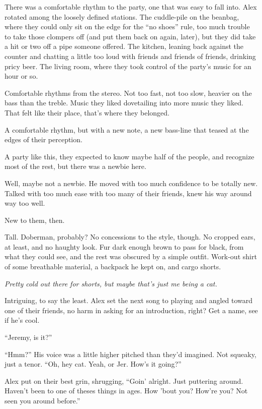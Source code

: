 There was a comfortable rhythm to the party, one that was easy to fall into. Alex rotated among the loosely defined stations. The cuddle-pile on the beanbag, where they could only sit on the edge for the ``no shoes'' rule, too much trouble to take those clompers off (and put them back on again, later), but they did take a hit or two off a pipe someone offered. The kitchen, leaning back against the counter and chatting a little too loud with friends and friends of friends, drinking pricy beer. The living room, where they took control of the party's music for an hour or so.

Comfortable rhythms from the stereo. Not too fast, not too slow, heavier on the bass than the treble. Music they liked dovetailing into more music they liked. That felt like their place, that's where they belonged.

A comfortable rhythm, but with a new note, a new bass-line that teased at the edges of their perception.

A party like this, they expected to know maybe half of the people, and recognize most of the rest, but there was a newbie here.

Well, maybe not a newbie. He moved with too much confidence to be totally new. Talked with too much ease with too many of their friends, knew his way around way too well.

New to them, then.

Tall. Doberman, probably? No concessions to the style, though. No cropped ears, at least, and no haughty look. Fur dark enough brown to pass for black, from what they could see, and the rest was obscured by a simple outfit. Work-out shirt of some breathable material, a backpack he kept on, and cargo shorts.

\emph{Pretty cold out there for shorts, but maybe that's just me being a cat.}

Intriguing, to say the least. Alex set the next song to playing and angled toward one of their friends, no harm in asking for an introduction, right? Get a name, see if he's cool.

``Jeremy, is it?''

``Hmm?'' His voice was a little higher pitched than they'd imagined. Not squeaky, just a tenor. ``Oh, hey cat. Yeah, or Jer. How's it going?''

Alex put on their best grin, shrugging, ``Goin' alright. Just puttering around. Haven't been to one of theses things in ages. How 'bout you? How're you? Not seen you around before.''

